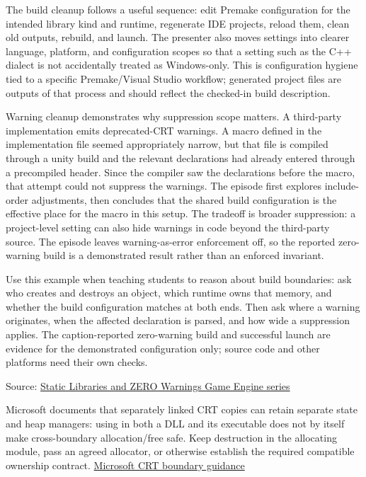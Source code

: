The build cleanup follows a useful sequence: edit Premake configuration for the intended library kind and runtime, regenerate IDE projects, reload them, clean old outputs, rebuild, and launch. The presenter also moves settings into clearer language, platform, and configuration scopes so that a setting such as the C++ dialect is not accidentally treated as Windows-only. This is configuration hygiene tied to a specific Premake/Visual Studio workflow; generated project files are outputs of that process and should reflect the checked-in build description.

Warning cleanup demonstrates why suppression scope matters. A third-party implementation emits deprecated-CRT warnings. A macro defined in the implementation file seemed appropriately narrow, but that file is compiled through a unity build and the relevant declarations had already entered through a precompiled header. Since the compiler saw the declarations before the macro, that attempt could not suppress the warnings. The episode first explores include-order adjustments, then concludes that the shared build configuration is the effective place for the macro in this setup. The tradeoff is broader suppression: a project-level setting can also hide warnings in code beyond the third-party source. The episode leaves warning-as-error enforcement off, so the reported zero-warning build is a demonstrated result rather than an enforced invariant.

Use this example when teaching students to reason about build boundaries: ask who creates and destroys an object, which runtime owns that memory, and whether the build configuration matches at both ends. Then ask where a warning originates, when the affected declaration is parsed, and how wide a suppression applies. The caption-reported zero-warning build and successful launch are evidence for the demonstrated configuration only; source code and other platforms need their own checks.

Source: \href{https://www.youtube.com/watch?v=TlvmnoDlrI0}{Static Libraries and ZERO Warnings \textbar{} Game Engine series}

Microsoft documents that separately linked CRT copies can retain separate state and heap managers: using  in both a DLL and its executable does not by itself make cross-boundary allocation/free safe. Keep destruction in the allocating module, pass an agreed allocator, or otherwise establish the required compatible ownership contract. \href{https://learn.microsoft.com/en-us/cpp/c-runtime-library/potential-errors-passing-crt-objects-across-dll-boundaries?view=msvc-170}{Microsoft CRT boundary guidance}


